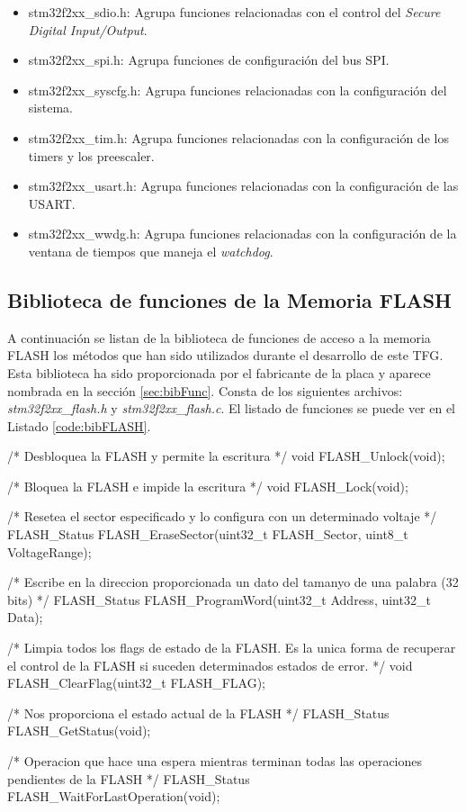 \begin{itemize}
\item stm32f2xx\_sdio.h: Agrupa funciones relacionadas con el control del \textit{Secure Digital Input/Output}.
\item stm32f2xx\_spi.h: Agrupa funciones de configuración del bus SPI.
\item stm32f2xx\_syscfg.h: Agrupa funciones relacionadas con la configuración del sistema.
\item stm32f2xx\_tim.h: Agrupa funciones relacionadas con la configuración de los timers y los preescaler.
\item stm32f2xx\_usart.h: Agrupa funciones relacionadas con la configuración de las \acf{USART}.
\item stm32f2xx\_wwdg.h: Agrupa funciones relacionadas con la configuración de la ventana de tiempos que maneja el \textit{watchdog}.
\end{itemize}

\subsection{Biblioteca de funciones de la Memoria FLASH} 
A continuación se listan de la biblioteca de funciones de acceso a la memoria FLASH los métodos que han sido utilizados durante el desarrollo de este \acs{TFG}. Esta biblioteca ha sido proporcionada por el fabricante de la placa y aparece nombrada en la sección \ref{sec:bibFunc}. Consta de los siguientes archivos: \textit{stm32f2xx\_flash.h} y \textit{stm32f2xx\_flash.c}. El listado de funciones se puede ver en el Listado \ref{code:bibFLASH}.\\

\begin{listing}[
  language = C,
  rulesepcolor = \color{black},
  caption  = {Biblioteca de acceso a la memoria FLASH},
  label    = code:bibFLASH]
/* Desbloquea la FLASH y permite la escritura */
void FLASH_Unlock(void); 

/* Bloquea la FLASH e impide la escritura */
void FLASH_Lock(void);  

/* Resetea el sector especificado y lo configura con un determinado voltaje */
FLASH_Status FLASH_EraseSector(uint32_t FLASH_Sector, uint8_t VoltageRange); 

/* Escribe en la direccion proporcionada un dato del tamanyo de una palabra (32 bits) */
FLASH_Status FLASH_ProgramWord(uint32_t Address, uint32_t Data);    

/* Limpia todos los flags de estado de la FLASH. Es la unica forma de recuperar el control de la FLASH si suceden determinados estados de error. */
void FLASH_ClearFlag(uint32_t FLASH_FLAG); 

/* Nos proporciona el estado actual de la FLASH */
FLASH_Status FLASH_GetStatus(void); 

/* Operacion que hace una espera mientras terminan todas las operaciones pendientes de la FLASH */
FLASH_Status FLASH_WaitForLastOperation(void); 
\end{listing}

